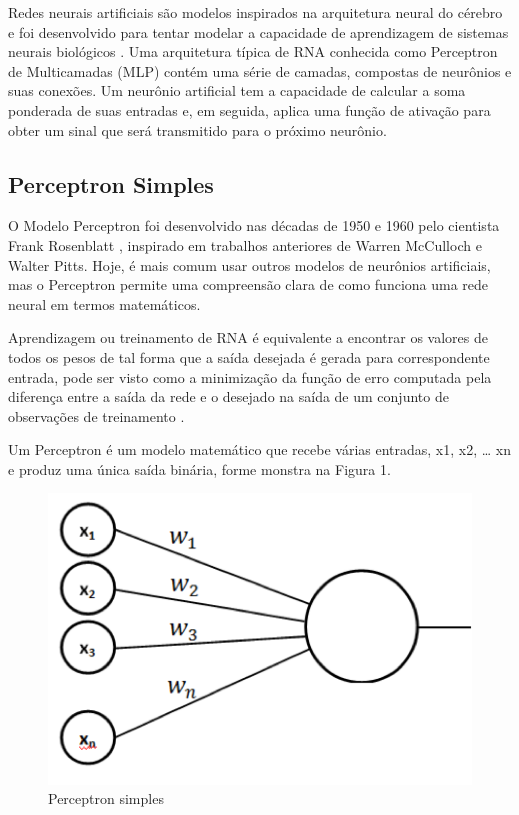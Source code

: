 \documentclass[conference]{IEEEtran}
\begin{document}
	Redes neurais artificiais são modelos inspirados na arquitetura neural do cérebro e foi desenvolvido para tentar modelar a capacidade de aprendizagem de sistemas neurais biológicos \cite{b4}. Uma arquitetura típica de RNA conhecida como Perceptron de Multicamadas (MLP) contém uma série de camadas, compostas de neurônios e suas conexões. Um neurônio artificial tem a capacidade de calcular a soma ponderada de suas entradas e, em seguida, aplica uma função de ativação para obter um sinal que será transmitido para o próximo neurônio.
	
	\subsection{Perceptron Simples}
	O Modelo Perceptron foi desenvolvido nas décadas de 1950 e 1960 pelo cientista Frank Rosenblatt \cite{b9}, inspirado em trabalhos anteriores de Warren McCulloch e Walter Pitts. Hoje, é mais comum usar outros modelos de neurônios artificiais, mas o Perceptron permite uma compreensão clara de como funciona uma rede neural em termos matemáticos.
	
	
    Aprendizagem ou treinamento de RNA é equivalente a encontrar os valores de todos os pesos de tal forma que a saída desejada é gerada para correspondente entrada, pode ser visto como a minimização da função de erro computada pela diferença entre a saída da rede e o desejado na saída de um conjunto de observações de treinamento \cite{b6}.
	
	Um Perceptron é um modelo matemático que recebe várias entradas, x1, x2, … xn e produz uma única saída binária, forme monstra na Figura 1.
	
	\begin{figure}[htbp]
	\centerline{\includegraphics[scale=1]{Perceptron.png}}
	\caption{Perceptron simples}
	\label{fig}
	\end{figure}
	
\end{document}
